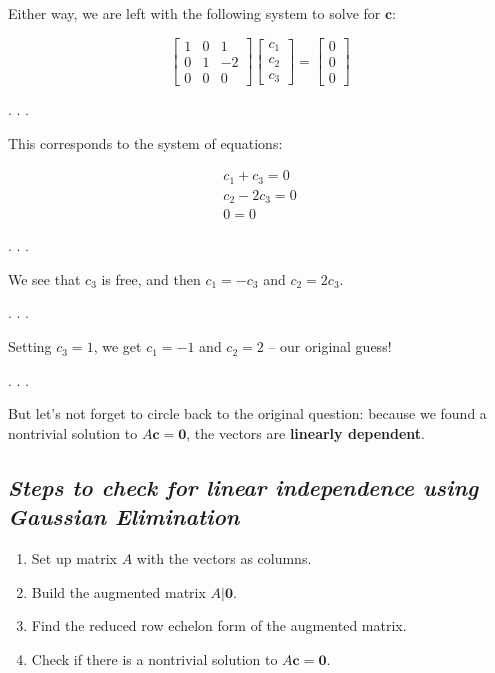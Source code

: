 \documentclass[
  letterpaper,
  DIV=11,
  numbers=noendperiod]{scrartcl}
\providecommand{\tightlist}{%
  \setlength{\itemsep}{0pt}\setlength{\parskip}{0pt}}\usepackage{longtable,booktabs,array}
\begin{document}
\subsection{\texorpdfstring{\emph{}}{}}\label{section-2}

Either way, we are left with the following system to solve for
\(\mathbf{c}\):

\[
\left[\begin{array}{rrr}
1 & 0 & 1 \\
0 & 1 & -2 \\
0 & 0 & 0
\end{array}\right]
\left[\begin{array}{c}
c_1 \\ c_2 \\ c_3
\end{array}\right]
=
\left[\begin{array}{c}
0 \\ 0 \\ 0
\end{array}\right]
\]

. . .

This corresponds to the system of equations:

\[
\begin{gathered}
c_1 + c_3 = 0 \\
c_2 - 2c_3 = 0 \\
0 = 0
\end{gathered}
\]

. . .

We see that \(c_3\) is free, and then \(c_1 = -c_3\) and \(c_2 = 2c_3\).

. . .

Setting \(c_3 = 1\), we get \(c_1 = -1\) and \(c_2 = 2\) -- our original
guess!

. . .

But let's not forget to circle back to the original question: because we
found a nontrivial solution to \(A \mathbf{c}=\mathbf{0}\), the vectors
are \textbf{linearly dependent}.

\subsection{\texorpdfstring{\emph{Steps to check for linear independence
using Gaussian
Elimination}}{Steps to check for linear independence using Gaussian Elimination}}\label{steps-to-check-for-linear-independence-using-gaussian-elimination}

\begin{enumerate}
\def\labelenumi{\arabic{enumi}.}
\tightlist
\item
  Set up matrix \(A\) with the vectors as columns.
\item
  Build the augmented matrix \(A | \mathbf{0}\).
\item
  Find the reduced row echelon form of the augmented matrix.
\item
  Check if there is a nontrivial solution to
  \(A \mathbf{c}=\mathbf{0}\).
\end{enumerate}
\end{document}

